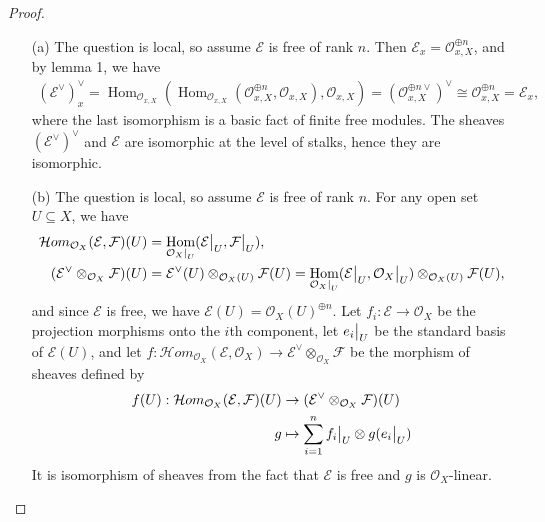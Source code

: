 \documentclass{article}
\newcommand{\fF}{\mathcal{F}}
\newcommand{\fE}{\mathcal{E}}
\newcommand{\fO}{\mathcal{O}}
\DeclareMathOperator{\Hom}{Hom}
\newcommand\srestr[2]{{%
  \left.\kern-\nulldelimiterspace %
  #1 %
  \vphantom{\small|} %
  \right|_{#2} %
}}
\newcommand\restr[2]{{%
  \left.\kern-\nulldelimiterspace %
  #1 %
  \vphantom{\big|} %
  \right|_{#2} %
}}
\begin{document}
\begin{enumerate} [label=\textbf{\arabic*.}, leftmargin=0em]
\begin{proof} $ $ \vspace{0pt}
\begin{itemize} [leftmargin=0em]
    \item[(a)] The question is local, so assume $\fE$ is free of rank $n$. Then $\fE_x = \fO_{x, X}^{\oplus n}$, and by lemma 1, we have
    \begin{align*}
        (\fE^\vee)^\vee_x = \Hom_{\fO_{x, X}}(\Hom_{\fO_{x, X}}(\fO_{x, X}^{\oplus n}, \fO_{x, X}), \fO_{x, X}) = (\fO_{x, X}^{\oplus n\vee})^\vee \cong \fO_{x, X}^{\oplus n} = \fE_x,
    \end{align*}
    where the last isomorphism is a basic fact of finite free modules. The sheaves $(\fE^\vee)^\vee$ and $\fE$ are isomorphic at the level of stalks, hence they are isomorphic.

    \item[(b)] The question is local, so assume $\fE$ is free of rank $n$. For any open set $U \subseteq X$, we have
    \begin{align*}
        \mathcal{H}om_{\fO_X}(\fE, \fF)(U) & = \Hom_{\srestr{\fO_X}{U}}(\restr{\fE}{U}, \restr{\fF}{U}), \\
        (\fE^\vee \otimes_{\fO_X} \fF)(U) & = \fE^\vee(U) \otimes_{\fO_X(U)} \fF(U) = \Hom_{\srestr{\fO_X}{U}}(\restr{\fE}{U}, \restr{\fO_X}{U}) \otimes_{\fO_X(U)} \fF(U),
    \end{align*}
    and since $\fE$ is free, we have $\fE(U) = \fO_X(U)^{\oplus n}$. Let $f_i : \fE \to \fO_X$ be the projection morphisms onto the $i$th component, let $\restr{e_i}{U}$ be the standard basis of $\fE(U)$, and let $f : \mathcal{H}om_{\fO_X}(\fE, \fO_X) \to \fE^\vee \otimes_{\fO_X} \fF$ be the morphism of sheaves defined by
    \begin{align*}
        f(U) : \mathcal{H}om_{\fO_X}(\fE, \fF)(U) & \to (\fE^\vee \otimes_{\fO_X} \fF)(U) \\
        g & \mapsto \sum_{i = 1}^n \restr{f_i}{U} \otimes g(\restr{e_i}{U})
    \end{align*}
    It is isomorphism of sheaves from the fact that $\fE$ is free and $g$ is $\fO_X$-linear.


\end{itemize}
\end{proof}
\end{enumerate}
\end{document}
